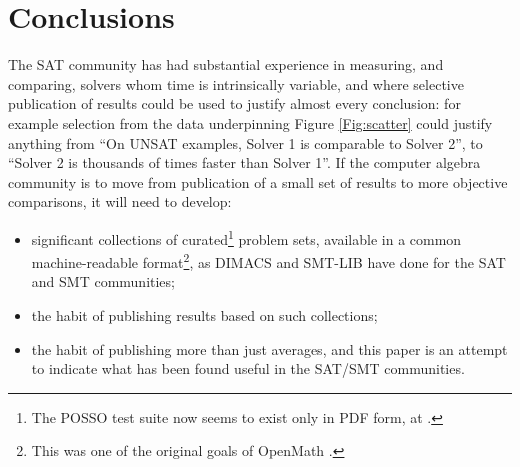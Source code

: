 \documentclass{easychair}
\begin{document}
\section{Conclusions}
The SAT community has had substantial experience in measuring, and comparing, solvers whom time is intrinsically variable, and where selective publication of results could be used to justify almost every conclusion: for example selection from the data underpinning Figure \ref{Fig:scatter} could justify anything from ``On UNSAT examples, Solver 1 is comparable to Solver 2'', to ``Solver 2 is thousands of times faster than Solver 1''. If the computer algebra community is to move from publication of a small set of results to more objective comparisons, it will need to develop:
\begin{itemize}
\item significant collections of curated\footnote{The POSSO test suite now seems to exist only in PDF form, at \cite{BiniMourrain1996}.} problem sets, available in a common machine-readable format\footnote{This was one of the original goals of OpenMath \cite{Abbottetal1996}.}, as DIMACS \cite{Spence2015a} and SMT-LIB \cite{Barrettetal2015b} have done for the SAT and SMT communities;
\item the habit of publishing results based on such collections;
\item the habit of publishing more than just averages, and this paper is an attempt to indicate what has been found useful in the SAT/SMT communities.
\end{itemize}

\end{document}
